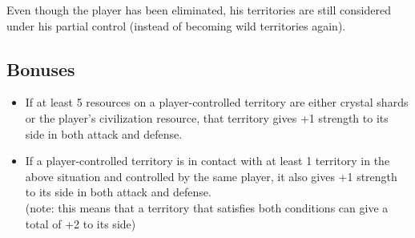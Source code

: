 \documentclass[a4paper]{article}
\begin{document}
        Even though the player has been eliminated,
        his territories are still considered under his partial control
        (instead of becoming wild territories again).
        
\newpage
    \subsection{Bonuses}
        \begin{itemize}
            \item If at least 5 resources on a player-controlled territory are either
                crystal shards or the player's civilization resource,
                that territory gives +1 strength to its side in both attack and defense.
            \item If a player-controlled territory is in contact with at least 1 territory
                in the above situation and controlled by the same player,
                it also gives +1 strength to its side in both attack and defense.\\
                (note: this means that a territory that satisfies both conditions
                can give a total of +2 to its side)
        \end{itemize}
        
\end{document}
